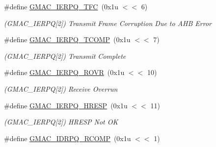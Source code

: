 \begin{DoxyCompactItemize}
\mbox{\label{group__SAMV71__GMAC_gaa801a5e7a330ce350590bfd2aa6be841}} 
\#define \mbox{\hyperlink{group__SAMV71__GMAC_gaa801a5e7a330ce350590bfd2aa6be841}{G\+M\+A\+C\+\_\+\+I\+E\+R\+P\+Q\+\_\+\+T\+FC}}~(0x1u $<$$<$ 6)
\begin{DoxyCompactList}\small\item\em (G\+M\+A\+C\+\_\+\+I\+E\+R\+PQ\mbox{[}2\mbox{]}) Transmit Frame Corruption Due to A\+HB Error \end{DoxyCompactList}\item 
\mbox{\label{group__SAMV71__GMAC_gab30e8199f302d9db875471495d2dcb83}} 
\#define \mbox{\hyperlink{group__SAMV71__GMAC_gab30e8199f302d9db875471495d2dcb83}{G\+M\+A\+C\+\_\+\+I\+E\+R\+P\+Q\+\_\+\+T\+C\+O\+MP}}~(0x1u $<$$<$ 7)
\begin{DoxyCompactList}\small\item\em (G\+M\+A\+C\+\_\+\+I\+E\+R\+PQ\mbox{[}2\mbox{]}) Transmit Complete \end{DoxyCompactList}\item 
\mbox{\label{group__SAMV71__GMAC_gab72f59f7fe751e546e3c9727fedd2e38}} 
\#define \mbox{\hyperlink{group__SAMV71__GMAC_gab72f59f7fe751e546e3c9727fedd2e38}{G\+M\+A\+C\+\_\+\+I\+E\+R\+P\+Q\+\_\+\+R\+O\+VR}}~(0x1u $<$$<$ 10)
\begin{DoxyCompactList}\small\item\em (G\+M\+A\+C\+\_\+\+I\+E\+R\+PQ\mbox{[}2\mbox{]}) Receive Overrun \end{DoxyCompactList}\item 
\mbox{\label{group__SAMV71__GMAC_ga0bf011798b2952235c079fa3753f495f}} 
\#define \mbox{\hyperlink{group__SAMV71__GMAC_ga0bf011798b2952235c079fa3753f495f}{G\+M\+A\+C\+\_\+\+I\+E\+R\+P\+Q\+\_\+\+H\+R\+E\+SP}}~(0x1u $<$$<$ 11)
\begin{DoxyCompactList}\small\item\em (G\+M\+A\+C\+\_\+\+I\+E\+R\+PQ\mbox{[}2\mbox{]}) H\+R\+E\+SP Not OK \end{DoxyCompactList}\item 
\mbox{\label{group__SAMV71__GMAC_ga0c8fbb03836000dec5315f1b53c296f2}} 
\#define \mbox{\hyperlink{group__SAMV71__GMAC_ga0c8fbb03836000dec5315f1b53c296f2}{G\+M\+A\+C\+\_\+\+I\+D\+R\+P\+Q\+\_\+\+R\+C\+O\+MP}}~(0x1u $<$$<$ 1)
$$
\end{DoxyCompactItemize}
